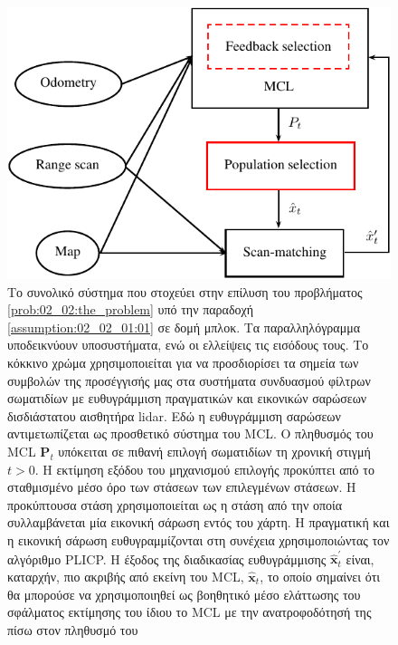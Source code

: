 \begin{figure}[h]\centering
  \includegraphics{./figures/parts/02/chapters/02/sections/03/overall_system}
  \caption{\small Το συνολικό σύστημα που στοχεύει στην επίλυση του προβλήματος
           \ref{prob:02_02:the_problem} υπό την παραδοχή
           \ref{assumption:02_02_01:01} σε δομή μπλοκ. Τα παραλληλόγραμμα
           υποδεικνύουν υποσυστήματα, ενώ οι ελλείψεις τις εισόδους τους. Το
           κόκκινο χρώμα χρησιμοποιείται για να προσδιορίσει τα σημεία των
           συμβολών της προσέγγισής μας στα συστήματα συνδυασμού φίλτρων
           σωματιδίων με ευθυγράμμιση πραγματικών και εικονικών σαρώσεων
           δισδιάστατου αισθητήρα lidar. Εδώ η ευθυγράμμιση σαρώσεων
           αντιμετωπίζεται ως προσθετικό σύστημα του MCL. Ο πληθυσμός του MCL
           $\bm{P}_t$ υπόκειται σε πιθανή επιλογή σωματιδίων τη χρονική στιγμή
           $t>0$. Η εκτίμηση εξόδου του μηχανισμού επιλογής προκύπτει από το
           σταθμισμένο μέσο όρο των στάσεων των επιλεγμένων στάσεων. Η
           προκύπτουσα στάση χρησιμοποιείται ως η στάση από την οποία
           συλλαμβάνεται μία εικονική σάρωση εντός του χάρτη. Η πραγματική και
           η εικονική σάρωση ευθυγραμμίζονται στη συνέχεια χρησιμοποιώντας τον
           αλγόριθμο PLICP. Η έξοδος της διαδικασίας ευθυγράμμισης
           $\hat{\bm{x}}^{\prime}_t$ είναι, καταρχήν, πιο ακριβής από εκείνη
           του MCL, $\hat{\bm{x}}_t$, το οποίο σημαίνει ότι θα μπορούσε να
           χρησιμοποιηθεί ως βοηθητικό μέσο ελάττωσης του σφάλματος εκτίμησης
           του ίδιου το MCL με την ανατροφοδότησή της πίσω στον πληθυσμό του}
  \label{fig:overall_system}
\end{figure}
